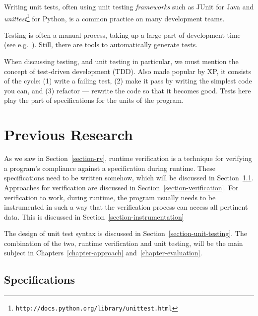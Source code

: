\documentclass[a4paper,11pt]{kth-mag}
\begin{document}
Writing unit tests, often using unit testing \textit{frameworks} such as JUnit
for Java and
\textit{unittest}\footnote{\texttt{http://docs.python.org/library/unittest.html}}
for Python, is a common practice on many development teams.

Testing is often a manual process, taking up a large part of development time
(see e.g.\ \cite{brooks75mythicalmanmonth}). Still, there are tools to
automatically generate tests.

When discussing testing, and unit testing in particular, we must mention the
concept of test-driven development (TDD). Also made popular by XP, it consists
of the cycle: (1) write a failing test, (2) make it pass by writing the
simplest code you can, and (3) refactor --- rewrite the code so that it becomes
good. Tests here play the part of specifications for the units of the program.






\pagestyle{newchap}
\chapter{Previous Research} \label{chapter-previous-research}

As we saw in Section~\ref{section-rv}, runtime verification is a technique for
verifying a program's compliance against a specification during runtime. These
specifications need to be written somehow, which will be discussed in
Section~\ref{section-specifications}. Approaches for verification are discussed
in Section~\ref{section-verification}. For verification to work, during
runtime, the program usually needs to be instrumented in such a way that the
verification process can access all pertinent data. This is discussed in
Section~\ref{section-instrumentation}

The design of unit test syntax is discussed in
Section~\ref{section-unit-testing}. The combination of the two, runtime
verification and unit testing, will be the main subject in
Chapters~\ref{chapter-approach} and~\ref{chapter-evaluation}.


\section{Specifications} \label{section-specifications}
\end{document}
